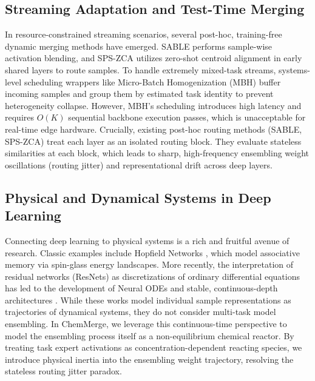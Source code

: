 \subsection{Streaming Adaptation and Test-Time Merging}
In resource-constrained streaming scenarios, several post-hoc, training-free dynamic merging methods have emerged. SABLE \cite{liang23sable} performs sample-wise activation blending, and SPS-ZCA \cite{zhang24spszca} utilizes zero-shot centroid alignment in early shared layers to route samples. To handle extremely mixed-task streams, systems-level scheduling wrappers like Micro-Batch Homogenization (MBH) buffer incoming samples and group them by estimated task identity to prevent heterogeneity collapse. However, MBH's scheduling introduces high latency and requires $O(K)$ sequential backbone execution passes, which is unacceptable for real-time edge hardware. Crucially, existing post-hoc routing methods (SABLE, SPS-ZCA) treat each layer as an isolated routing block. They evaluate stateless similarities at each block, which leads to sharp, high-frequency ensembling weight oscillations (routing jitter) and representational drift across deep layers.

\subsection{Physical and Dynamical Systems in Deep Learning}
Connecting deep learning to physical systems is a rich and fruitful avenue of research. Classic examples include Hopfield Networks \cite{hopfield1982neural}, which model associative memory via spin-glass energy landscapes. More recently, the interpretation of residual networks (ResNets) as discretizations of ordinary differential equations has led to the development of Neural ODEs \cite{chen2018neuralode} and stable, continuous-depth architectures \cite{haber2017stable, lu2018beyond, grathwohl2018ffjord}. While these works model individual sample representations as trajectories of dynamical systems, they do not consider multi-task model ensembling. In ChemMerge, we leverage this continuous-time perspective to model the ensembling process itself as a non-equilibrium chemical reactor. By treating task expert activations as concentration-dependent reacting species, we introduce physical inertia into the ensembling weight trajectory, resolving the stateless routing jitter paradox.
